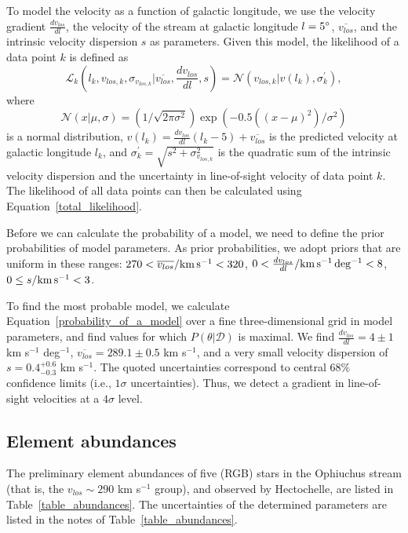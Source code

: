 \documentclass[iop]{emulateapj}
\begin{document}
To model the velocity as a function of galactic longitude, we use the velocity
gradient $\frac{dv_{los}}{dl}$, the velocity of the stream at galactic longitude
$l=5\mbox{$^\circ$}$, $\overline{v_{los}}$, and the intrinsic velocity dispersion $s$ as
parameters. Given this model, the likelihood of a data point $k$ is defined as
\begin{equation}
    \mathcal{L}_k(l_k, v_{los,k}, \sigma_{v_{los, k}} | \overline{v_{los}}, \frac{dv_{los}}{dl}, s) = \mathcal{N}(v_{los,k} | v(l_k), \sigma^\prime_k),
\end{equation}
where
\begin{equation}
\mathcal{N}(x|\mu,\sigma)=(1/\sqrt{2\pi\sigma^2})\exp(-0.5((x-\mu)^2)/\sigma^2)
\end{equation}
is a normal distribution,
$v(l_k) = \frac{dv_{los}}{dl}(l_k - 5) +\overline{v_{los}}$ is the predicted
velocity at galactic longitude $l_k$, and
$\sigma^\prime_k=\sqrt{s^2 + \sigma^2_{v_{los, k}}}$ is the quadratic sum of the
intrinsic velocity dispersion and the uncertainty in line-of-sight velocity of
data point $k$. The likelihood of all data points can then be calculated using
Equation~\ref{total_likelihood}.

Before we can calculate the probability of a model, we need to define the prior
probabilities of model parameters. As prior probabilities, we adopt priors that
are uniform in these ranges: $270 < \overline{v_{los}}/{\rm km\, s^{-1}} < 320$,
$0 < \frac{dv_{los}}{dl}/{\rm km\, s^{-1}\, deg^{-1}} < 8$,
$0 \leq s/{\rm km\, s^{-1}} < 3$.

To find the most probable model, we calculate
Equation~\ref{probability_of_a_model} over a fine three-dimensional grid in
model parameters, and find values for which $P(\theta | \mathcal{D})$ is
maximal. We find $\frac{dv_{los}}{dl}=4\pm1$ km s$^{-1}$ deg$^{-1}$,
$\overline{v_{los}}=289.1\pm0.5$ km s$^{-1}$, and a very small velocity
dispersion of $s=0.4_{-0.3}^{+0.6}$ km s$^{-1}$. The quoted uncertainties
correspond to central $68\%$ confidence limits (i.e., $1\sigma$ uncertainties).
Thus, we detect a gradient in line-of-sight velocities at a $4\sigma$ level.

\subsection{Element abundances\label{abundances}}

The preliminary element abundances of five (RGB) stars in the Ophiuchus stream
(that is, the $v_{los}\sim290$ km s$^{-1}$ group), and observed by Hectochelle, 
are listed in Table~\ref{table_abundances}. The uncertainties of the determined
parameters are listed in the notes of Table~\ref{table_abundances}.
\end{document}
